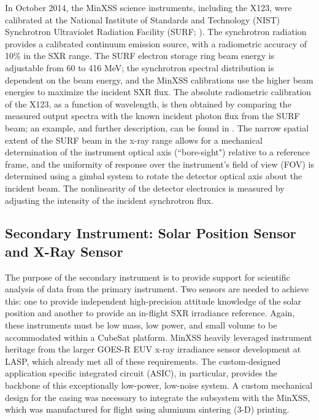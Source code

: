 In October 2014, the MinXSS science instruments, including the X123, were calibrated at the National Institute of Standards and Technology (NIST) Synchrotron Ultraviolet Radiation Facility (SURF; \citealt{Arp2011}). The synchrotron radiation provides a calibrated continuum emission source, with a radiometric accuracy of 10\% in the SXR range. The SURF electron storage ring beam energy is adjustable from 60 to 416 MeV; the synchrotron spectral distribution is dependent on the beam energy, and the MinXSS calibrations use the higher beam energies to maximize the incident SXR flux. The absolute radiometric calibration of the X123, as a function of wavelength, is then obtained by comparing the measured output spectra with the known incident photon flux from the SURF beam; an example, and further description, can be found in \citet{Caspi2015}. The narrow spatial extent of the SURF beam in the x-ray range allows for a mechanical determination of the instrument optical axis (``bore-sight") relative to a reference frame, and the uniformity of response over the instrument's field of view (FOV) is determined using a gimbal system to rotate the detector optical axis about the incident beam. The nonlinearity of the detector electronics is measured by adjusting the intensity of the incident synchrotron flux. 

\subsection{Secondary Instrument: Solar Position Sensor and X-Ray Sensor}
The purpose of the secondary instrument is to provide support for scientific analysis of data from the primary instrument. Two sensors are needed to achieve this: one to provide independent high-precision attitude knowledge of the solar position and another to provide an in-flight SXR irradiance reference. Again, these instruments must be low mass, low power, and small volume to be accommodated within a CubeSat platform. MinXSS heavily leveraged instrument heritage from the larger GOES-R EUV x-ray irradiance sensor development at LASP, which already met all of these requirements. The custom-designed application specific integrated circuit (ASIC), in particular, provides the backbone of this exceptionally low-power, low-noise system. A custom mechanical design for the casing was necessary to integrate the subsystem with the MinXSS, which was manufactured for flight using aluminum sintering (3-D) printing.

